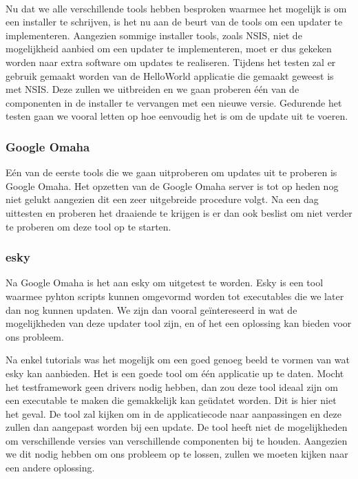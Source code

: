 \documentclass{article}
\begin{document}
\paragraph{}
Nu dat we alle verschillende tools hebben besproken waarmee het mogelijk is om een installer te schrijven, is het nu aan de beurt van de tools om een updater te implementeren.
Aangezien sommige installer tools, zoals NSIS, niet de mogelijkheid aanbied om een updater te implementeren, moet er dus gekeken worden naar extra software om updates te realiseren.
Tijdens het testen zal er gebruik gemaakt worden van de HelloWorld applicatie die gemaakt geweest is met NSIS.
Deze zullen we uitbreiden en we gaan proberen \'e\'en van de componenten in de installer te vervangen met een nieuwe versie.
Gedurende het testen gaan we vooral letten op hoe eenvoudig het is om de update uit te voeren.

\subsubsection{Google Omaha}
E\'en van de eerste tools die we gaan uitproberen om updates uit te proberen is Google Omaha.
Het opzetten van de Google Omaha server is tot op heden nog niet gelukt aangezien dit een zeer uitgebreide procedure volgt.
Na een dag uittesten en proberen het draaiende te krijgen is er dan ook beslist om niet verder te proberen om deze tool op te starten.

\subsubsection{esky}
Na Google Omaha is het aan esky om uitgetest te worden.
Esky is een tool waarmee pyhton scripts kunnen omgevormd worden tot executables die we later dan nog kunnen updaten.
We zijn dan vooral ge\"intereseerd in wat de mogelijkheden van deze updater tool zijn, en of het een oplossing kan bieden voor ons probleem.

Na enkel tutorials was het mogelijk om een goed genoeg beeld te vormen van wat esky kan aanbieden.
Het is een goede tool om \'e\'en applicatie up te daten.
Mocht het testframework geen drivers nodig hebben, dan zou deze tool ideaal zijn om een executable te maken die gemakkelijk kan ge\"udatet worden.
Dit is hier niet het geval.
De tool zal kijken om in de applicatiecode naar aanpassingen en deze zullen dan aangepast worden bij een update.
De tool heeft niet de mogelijkheden om verschillende versies van verschillende componenten bij te houden.
Aangezien we dit nodig hebben om ons probleem op te lossen, zullen we moeten kijken naar een andere oplossing.
\end{document}
